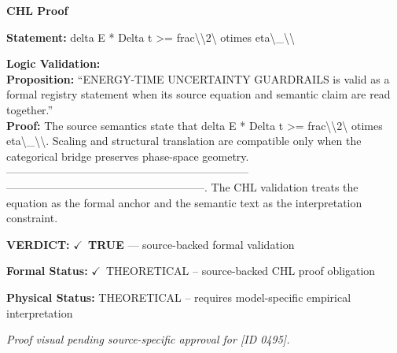 \vspace{0.45em}
\noindent\textbf{CHL Proof}\par
\textbf{Statement:} delta E * Delta t >= frac\textbackslash{}\textbackslash{}2\textbackslash{} otimes eta\textbackslash{}\_\textbackslash{}\textbackslash{}

\textbf{Logic Validation:}\\
\textbf{Proposition:} ``ENERGY-TIME UNCERTAINTY GUARDRAILS is valid as a formal registry statement when its
source equation and semantic claim are read together.''\\
\textbf{Proof:} The source semantics state that delta E * Delta t >= frac\textbackslash{}\textbackslash{}2\textbackslash{} otimes eta\textbackslash{}\_\textbackslash{}\textbackslash{}. Scaling
and structural translation are compatible only when the categorical bridge preserves
phase-space geometry. ------------------------------------------------------------------
------------------------------------------------------. The CHL validation treats the
equation as the formal anchor and the semantic text as the interpretation constraint.

\textbf{VERDICT:} \ensuremath{\checkmark}\ \textbf{TRUE} --- source-backed formal validation

\textbf{Formal Status:} \ensuremath{\checkmark}\ THEORETICAL -- source-backed CHL proof obligation

\textbf{Physical Status:} THEORETICAL -- requires model-specific empirical interpretation
\par\vspace{0.45em}
\par
\vfill
\begingroup\footnotesize\itshape
Proof visual pending source-specific approval for [ID 0495].
\par\endgroup
\vfill
\endgroup
\endgroup
